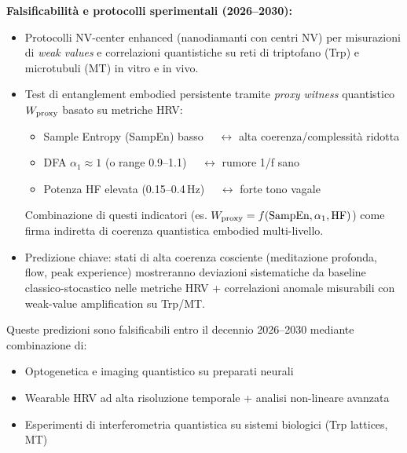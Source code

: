 \documentclass[11pt,a4paper]{article}
\theoremstyle{plain}
\theoremstyle{definition}
\begin{document}
\textbf{Falsificabilità e protocolli sperimentali (2026–2030):}

\begin{itemize}
    \item Protocolli NV-center enhanced (nanodiamanti con centri NV) per misurazioni di \textit{weak values} e correlazioni quantistiche su reti di triptofano (Trp) e microtubuli (MT) in vitro e in vivo.
    
    \item Test di entanglement embodied persistente tramite \textit{proxy witness} quantistico $W_{\rm proxy}$ basato su metriche HRV:
    \begin{itemize}
        \item Sample Entropy (SampEn) basso $\quad \leftrightarrow$ alta coerenza/complessità ridotta
        \item DFA $\alpha_1 \approx 1$ (o range 0.9–1.1) $\quad \leftrightarrow$ rumore 1/f sano
        \item Potenza HF elevata (0.15–0.4\,Hz) $\quad \leftrightarrow$ forte tono vagale
    \end{itemize}
    Combinazione di questi indicatori (es. $W_{\rm proxy} = f(\text{SampEn}, \alpha_1, \text{HF})$) come firma indiretta di coerenza quantistica embodied multi-livello.

    \item Predizione chiave: stati di alta coerenza cosciente (meditazione profonda, flow, peak experience) mostreranno deviazioni sistematiche da baseline classico-stocastico nelle metriche HRV + correlazioni anomale misurabili con weak-value amplification su Trp/MT.
\end{itemize}

Queste predizioni sono falsificabili entro il decennio 2026–2030 mediante combinazione di:
\begin{itemize}
    \item Optogenetica e imaging quantistico su preparati neurali
    \item Wearable HRV ad alta risoluzione temporale + analisi non-lineare avanzata
    \item Esperimenti di interferometria quantistica su sistemi biologici (Trp lattices, MT)
\end{itemize}






\vspace{0.3cm}
\end{document}
